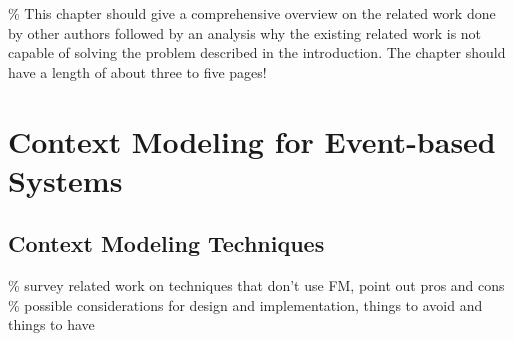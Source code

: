 \% This chapter should give a comprehensive overview on the related work done by other authors followed by an analysis why the existing related work is not capable of solving the problem described in the introduction. The chapter should have a length of about three to five pages!

\section{Context Modeling for Event-based Systems}

\subsection{Context Modeling Techniques}
\% survey related work on techniques that don't use FM, point out pros and cons \\
\% possible considerations for design and implementation, things to avoid and things to have \\ \\

